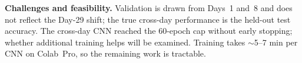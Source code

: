 \documentclass[final]{article}
\begin{document}
\textbf{Challenges and feasibility.}
Validation is drawn from Days~1 and~8 and does not reflect the Day-29 shift; the true cross-day performance is the held-out test accuracy. The cross-day CNN reached the 60-epoch cap without early stopping; whether additional training helps will be examined. Training takes $\sim$5--7 min per CNN on Colab~Pro, so the remaining work is tractable.



\end{document}
